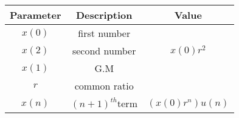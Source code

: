 \begin{tabular}{|c|c|c|}
        \hline
        \textbf{Parameter} & \textbf{Description} &\textbf{Value}\\
        \hline
        $x(0)$ & first number& \\
         \hline
        $x(2)$ & second number & $x(0)r^2$\\
        \hline
	$x(1)$&G.M& \\
	\hline
        $r$ & common ratio &\\
        \hline
        $x(n)$ & $(n + 1)^{th}$term & $(x(0)r^n)u(n)$\\
        \hline
    \end{tabular}
